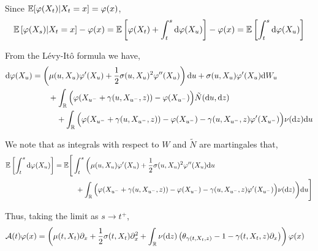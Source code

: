 \documentclass[10pt]{article}
\begin{document}
\begin{solution}[Solution]
Since \( \mathbb{E}[\varphi(X_t)|X_t = x] = \varphi(x) \),
\begin{align*}
    \mathbb{E} \left[ \varphi(X_s) | X_t = x \right] - \varphi(x)
    = \mathbb{E} \left[ \varphi(X_t) + \int_{t}^{s}\mathrm{d} \varphi(X_u) \right] - \varphi(x)
    = \mathbb{E} \left[ \int_{t}^{s}\mathrm{d} \varphi(X_u) \right]
\end{align*}



From the L\'evy-It\^o formula we have,
\begin{align*}
    \mathrm{d} \varphi(X_u)
    &= \left( \mu(u,X_u) \varphi'(X_u) + \dfrac{1}{2}\sigma(u,X_u)^2\varphi''(X_u)\right)\mathrm{d} u
    + \sigma(u,X_u)\varphi'(X_u) \mathrm{d} W_u
    \\&\hspace{2em}+ \int_{\mathbb{R}} \Big(\varphi(X_{u^-}+\gamma(u,X_{u^-},z)) - \varphi(X_{u^-}) \Big) \tilde{N}(\mathrm{d} u, \mathrm{d} z)
    \\&\hspace{3em}+ \int_{\mathbb{R}} \Big(\varphi(X_{u^-}+\gamma(u,X_{u^-},z)) - \varphi(X_{u^-}) - \gamma(u,X_{u^-},z)\varphi'(X_{u^-})\Big) \nu(\mathrm{d} z) \mathrm{d} u
\end{align*}

We note that as integrals with respect to \( W \) and \( \tilde{N}  \) are martingales that,
\begin{align*}
    \mathbb{E} \left[ \int_{t}^{s} \mathrm{d} \varphi(X_u) \right] 
    &= \mathbb{E} \Bigg[ \int_{t}^{s} \bigg( \mu(u,X_u) \varphi'(X_u) + \dfrac{1}{2}\sigma(u,X_u)^2\varphi''(X_u)\mathrm{d} u
    \\&\hspace{3em}+ \int_{\mathbb{R}} \Big(\varphi(X_{u^-}+\gamma(u,X_{u^-},z)) - \varphi(X_{u^-}) - \gamma(u,X_{u^-},z)\varphi'(X_{u^-})\Big) \nu(\mathrm{d} z) \bigg) \mathrm{d} u \Bigg]
\end{align*}

Thus, taking the limit as \( s\to t^+ \),
\begin{align*}
    \mathcal{A} (t) \varphi(x) 
    &= \left( \mu(t,X_t) \partial_x + \dfrac{1}{2} \sigma(t,X_t) \partial_x^2 + \int_{\mathbb{R}} \nu(\mathrm{d} z) \left(\theta_{\gamma(t,X_t,z)} - 1 - \gamma(t,X_t,z) \partial_x\right) \right)\varphi(x)
\end{align*}
\end{solution}
\end{document}
